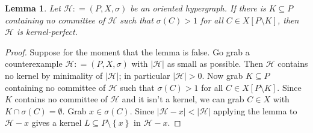 \documentclass[12pt]{article}
\newtheorem{lemma}{Lemma}
\newcommand{\fancy}[1]{\mathcal{#1}}
\newcommand{\HH}{\fancy{H}}
\newcommand{\set}[1]{\left\{ #1 \right\}}
\newcommand{\card}[1]{\left|#1\right|}
\newcommand{\brackets}[1]{\left[ #1 \right]}
\newcommand{\DefinedAs}{\mathrel{\mathop:}=}
\begin{document}
\begin{lemma}
Let $\HH \DefinedAs (P,X,\sigma)$ be an oriented hypergraph.  If there is $K \subseteq P$ containing no committee of $\HH$ 
such that $\sigma(C) > 1$ for all $C \in X\brackets{P \setminus K}$, then $\HH$ is kernel-perfect.
\end{lemma}
\begin{proof}
Suppose for the moment that the lemma is false.  Go grab a counterexample $\HH \DefinedAs (P,X,\sigma)$ with $\card{\HH}$ as small as possible.
Then $\HH$ contains no kernel by minimality of $\card{\HH}$; in particular $\card{\HH} > 0$. Now grab $K \subseteq P$ containing no committee of $\HH$ such that $\sigma(C) > 1$ for all $C \in X\brackets{P \setminus K}$.  Since $K$ contains no
committee of $\HH$ and it isn't a kernel, we can grab $C \in X$ with $K \cap \sigma(C) = \emptyset$.  Grab $x \in \sigma(C)$.  Since $\card{\HH - x} < \card{\HH}$ applying the lemma to $\HH -x$ gives a kernel $L \subseteq P \setminus\set{x}$ in $\HH-x$.
\end{proof}
\end{document}
